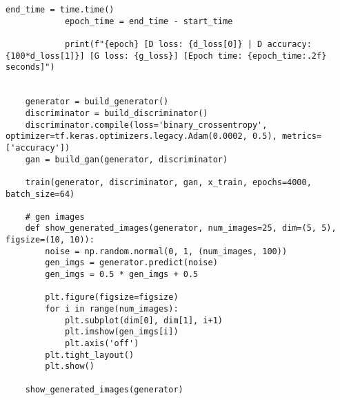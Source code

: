 \begin{lstlisting}[style=mypython, caption=Apply new dataset]
            end_time = time.time()
            epoch_time = end_time - start_time

            print(f"{epoch} [D loss: {d_loss[0]} | D accuracy: {100*d_loss[1]}] [G loss: {g_loss}] [Epoch time: {epoch_time:.2f} seconds]")

    
    generator = build_generator()
    discriminator = build_discriminator()
    discriminator.compile(loss='binary_crossentropy', optimizer=tf.keras.optimizers.legacy.Adam(0.0002, 0.5), metrics=['accuracy'])
    gan = build_gan(generator, discriminator)

    train(generator, discriminator, gan, x_train, epochs=4000, batch_size=64)

    # gen images
    def show_generated_images(generator, num_images=25, dim=(5, 5), figsize=(10, 10)):
        noise = np.random.normal(0, 1, (num_images, 100))
        gen_imgs = generator.predict(noise)
        gen_imgs = 0.5 * gen_imgs + 0.5

        plt.figure(figsize=figsize)
        for i in range(num_images):
            plt.subplot(dim[0], dim[1], i+1)
            plt.imshow(gen_imgs[i])
            plt.axis('off')
        plt.tight_layout()
        plt.show()

    show_generated_images(generator)
\end{lstlisting}